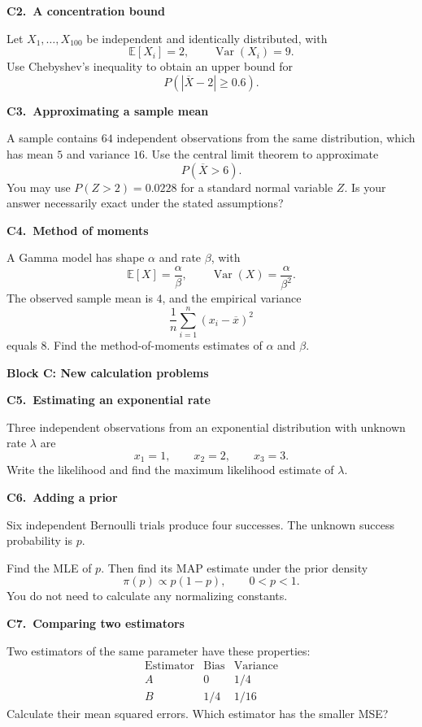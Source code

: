 \documentclass[11pt,a4paper]{article}
\newcommand{\blocktitle}[2]{{\Large\sffamily\bfseries\color{Ink}Block #1: #2}\par\vspace{5pt}}
\newenvironment{question}[2]{\par\addvspace{10pt}\begin{minipage}{\linewidth}{\sffamily\bfseries\color{Ink}#1.\ #2}\par\vspace{3pt}}{\end{minipage}\par}
\newcommand{\E}{\mathbb E}
\newcommand{\Var}{\operatorname{Var}}
\begin{document}
\begin{question}{C2}{A concentration bound}
Let $X_1,\ldots,X_{100}$ be independent and identically distributed, with
\[
\E[X_i]=2,\qquad \Var(X_i)=9.
\]
Use Chebyshev's inequality to obtain an upper bound for
\[
P\left(|\overline X-2|\ge0.6\right).
\]
\end{question}

\begin{question}{C3}{Approximating a sample mean}
A sample contains $64$ independent observations from the same distribution,
which has mean $5$ and variance $16$. Use the central limit theorem to
approximate
\[
P(\overline X>6).
\]
You may use $P(Z>2)=0.0228$ for a standard normal variable $Z$.
Is your answer necessarily exact under the stated assumptions?
\end{question}

\begin{question}{C4}{Method of moments}
A Gamma model has shape $\alpha$ and rate $\beta$, with
\[
\E[X]=\frac{\alpha}{\beta},\qquad
\Var(X)=\frac{\alpha}{\beta^2}.
\]
The observed sample mean is $4$, and the empirical variance
\[
\frac1n\sum_{i=1}^n(x_i-\overline x)^2
\]
equals $8$. Find the method-of-moments estimates of $\alpha$ and $\beta$.
\end{question}

\newpage
\blocktitle{C}{New calculation problems}
\begin{question}{C5}{Estimating an exponential rate}
Three independent observations from an exponential distribution with unknown
rate $\lambda$ are
\[
x_1=1,\qquad x_2=2,\qquad x_3=3.
\]
Write the likelihood and find the maximum likelihood estimate of $\lambda$.
\end{question}

\begin{question}{C6}{Adding a prior}
Six independent Bernoulli trials produce four successes. The unknown success
probability is $p$.

Find the MLE of $p$. Then find its MAP estimate under the prior density
\[
\pi(p)\propto p(1-p),\qquad 0<p<1.
\]
You do not need to calculate any normalizing constants.
\end{question}

\begin{question}{C7}{Comparing two estimators}
Two estimators of the same parameter have these properties:
\[
\begin{array}{c|cc}
\text{Estimator}&\text{Bias}&\text{Variance}\\ \hline
A&0&1/4\\
B&1/4&1/16
\end{array}
\]
Calculate their mean squared errors. Which estimator has the smaller MSE?
\end{question}
\end{document}
